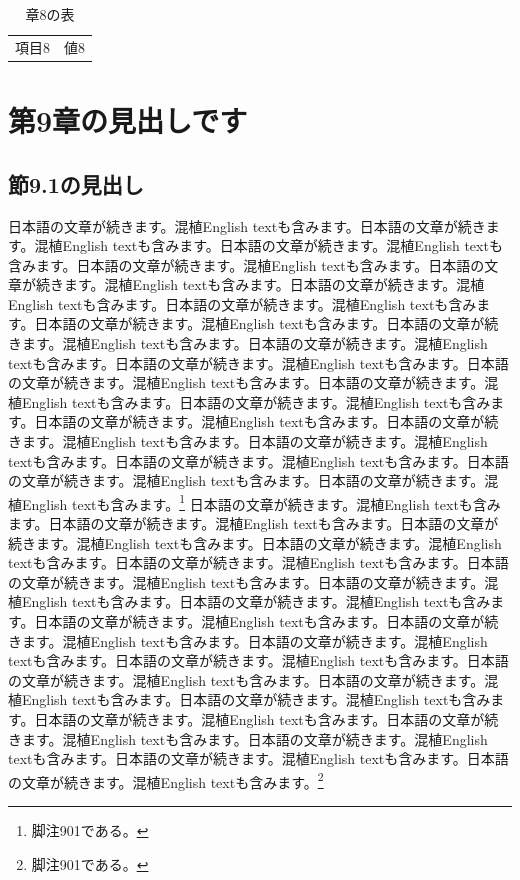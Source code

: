 \documentclass[pdflatex,book]{jlreq}
\begin{document}
\begin{table}[htbp]\centering\caption{章8の表}\begin{tabular}{cc}項目8 & 値8\\\end{tabular}\end{table}

\chapter{第9章の見出しです}
\section{節9.1の見出し}
日本語の文章が続きます。混植English textも含みます。日本語の文章が続きます。混植English textも含みます。日本語の文章が続きます。混植English textも含みます。日本語の文章が続きます。混植English textも含みます。日本語の文章が続きます。混植English textも含みます。日本語の文章が続きます。混植English textも含みます。日本語の文章が続きます。混植English textも含みます。日本語の文章が続きます。混植English textも含みます。日本語の文章が続きます。混植English textも含みます。日本語の文章が続きます。混植English textも含みます。日本語の文章が続きます。混植English textも含みます。日本語の文章が続きます。混植English textも含みます。日本語の文章が続きます。混植English textも含みます。日本語の文章が続きます。混植English textも含みます。日本語の文章が続きます。混植English textも含みます。日本語の文章が続きます。混植English textも含みます。日本語の文章が続きます。混植English textも含みます。日本語の文章が続きます。混植English textも含みます。日本語の文章が続きます。混植English textも含みます。日本語の文章が続きます。混植English textも含みます。\footnote{脚注901である。}
日本語の文章が続きます。混植English textも含みます。日本語の文章が続きます。混植English textも含みます。日本語の文章が続きます。混植English textも含みます。日本語の文章が続きます。混植English textも含みます。日本語の文章が続きます。混植English textも含みます。日本語の文章が続きます。混植English textも含みます。日本語の文章が続きます。混植English textも含みます。日本語の文章が続きます。混植English textも含みます。日本語の文章が続きます。混植English textも含みます。日本語の文章が続きます。混植English textも含みます。日本語の文章が続きます。混植English textも含みます。日本語の文章が続きます。混植English textも含みます。日本語の文章が続きます。混植English textも含みます。日本語の文章が続きます。混植English textも含みます。日本語の文章が続きます。混植English textも含みます。日本語の文章が続きます。混植English textも含みます。日本語の文章が続きます。混植English textも含みます。日本語の文章が続きます。混植English textも含みます。日本語の文章が続きます。混植English textも含みます。日本語の文章が続きます。混植English textも含みます。\footnote{脚注901である。}
\end{document}
